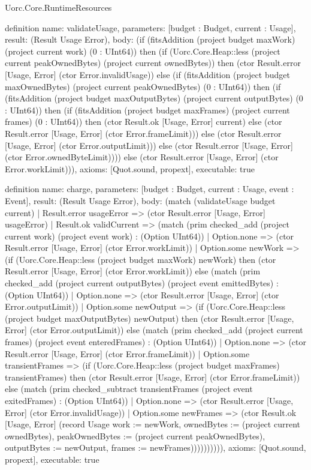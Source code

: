 \begin{lexlean}{Uorc.Core.RuntimeResources}
\begin{semanticmodule}
definition{
  name: validateUsage,
  parameters: [budget : Budget, current : Usage],
  result: (Result Usage Error),
  body: (if (fitsAddition (project budget maxWork) (project current work) (0 : UInt64)) then (if (Uorc.Core.Heap::less (project current peakOwnedBytes) (project current ownedBytes)) then (ctor Result.error [Usage, Error] (ctor Error.invalidUsage)) else (if (fitsAddition (project budget maxOwnedBytes) (project current peakOwnedBytes) (0 : UInt64)) then (if (fitsAddition (project budget maxOutputBytes) (project current outputBytes) (0 : UInt64)) then (if (fitsAddition (project budget maxFrames) (project current frames) (0 : UInt64)) then (ctor Result.ok [Usage, Error] current) else (ctor Result.error [Usage, Error] (ctor Error.frameLimit))) else (ctor Result.error [Usage, Error] (ctor Error.outputLimit))) else (ctor Result.error [Usage, Error] (ctor Error.ownedByteLimit)))) else (ctor Result.error [Usage, Error] (ctor Error.workLimit))),
  axioms: [Quot.sound, propext],
  executable: true
}

definition{
  name: charge,
  parameters: [budget : Budget, current : Usage, event : Event],
  result: (Result Usage Error),
  body: (match (validateUsage budget current)
    | Result.error usageError => (ctor Result.error [Usage, Error] usageError)
    | Result.ok validCurrent => (match (prim checked_add (project current work) (project event work) : (Option UInt64))
      | Option.none => (ctor Result.error [Usage, Error] (ctor Error.workLimit))
      | Option.some newWork => (if (Uorc.Core.Heap::less (project budget maxWork) newWork) then (ctor Result.error [Usage, Error] (ctor Error.workLimit)) else (match (prim checked_add (project current outputBytes) (project event emittedBytes) : (Option UInt64))
        | Option.none => (ctor Result.error [Usage, Error] (ctor Error.outputLimit))
        | Option.some newOutput => (if (Uorc.Core.Heap::less (project budget maxOutputBytes) newOutput) then (ctor Result.error [Usage, Error] (ctor Error.outputLimit)) else (match (prim checked_add (project current frames) (project event enteredFrames) : (Option UInt64))
          | Option.none => (ctor Result.error [Usage, Error] (ctor Error.frameLimit))
          | Option.some transientFrames => (if (Uorc.Core.Heap::less (project budget maxFrames) transientFrames) then (ctor Result.error [Usage, Error] (ctor Error.frameLimit)) else (match (prim checked_subtract transientFrames (project event exitedFrames) : (Option UInt64))
            | Option.none => (ctor Result.error [Usage, Error] (ctor Error.invalidUsage))
            | Option.some newFrames => (ctor Result.ok [Usage, Error] (record Usage {work := newWork, ownedBytes := (project current ownedBytes), peakOwnedBytes := (project current peakOwnedBytes), outputBytes := newOutput, frames := newFrames})))))))))),
  axioms: [Quot.sound, propext],
  executable: true
}


\end{semanticmodule}
\end{lexlean}
